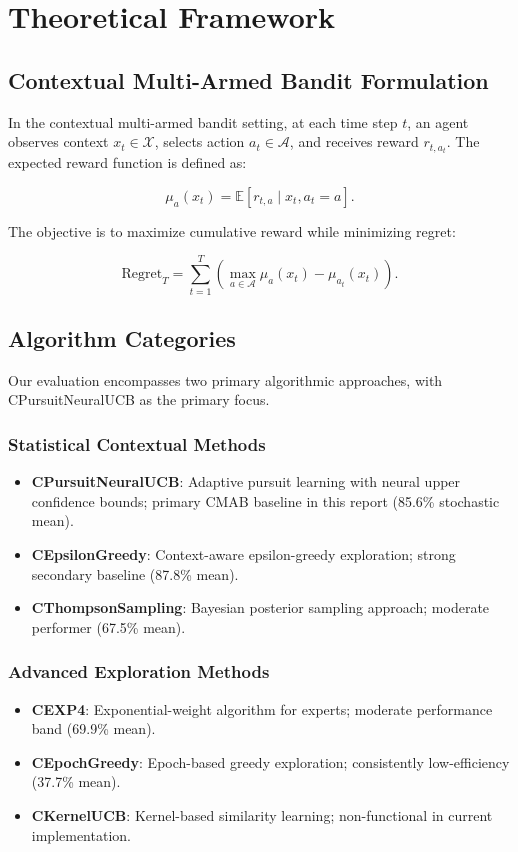 \documentclass[12pt,a4paper]{article}
\begin{document}
\section{Theoretical Framework}

\subsection{Contextual Multi-Armed Bandit Formulation}

In the contextual multi-armed bandit setting, at each time step $t$, an agent observes context $x_t \in \mathcal{X}$, selects action $a_t \in \mathcal{A}$, and receives reward $r_{t,a_t}$. The expected reward function is defined as:

\begin{equation}
\mu_a(x_t) = \mathbb{E}[r_{t,a} \mid x_t, a_t = a].
\end{equation}

The objective is to maximize cumulative reward while minimizing regret:

\begin{equation}
\text{Regret}_T = \sum_{t=1}^{T} \left(\max_{a \in \mathcal{A}} \mu_a(x_t) - \mu_{a_t}(x_t)\right).
\end{equation}

\subsection{Algorithm Categories}

Our evaluation encompasses two primary algorithmic approaches, with CPursuitNeuralUCB as the primary focus.

\subsubsection{Statistical Contextual Methods}
\begin{itemize}
    \item \textbf{CPursuitNeuralUCB}: Adaptive pursuit learning with neural upper confidence bounds; primary CMAB baseline in this report (85.6\% stochastic mean).
    \item \textbf{CEpsilonGreedy}: Context-aware epsilon-greedy exploration; strong secondary baseline (87.8\% mean).
    \item \textbf{CThompsonSampling}: Bayesian posterior sampling approach; moderate performer (67.5\% mean).
\end{itemize}

\subsubsection{Advanced Exploration Methods}
\begin{itemize}
    \item \textbf{CEXP4}: Exponential-weight algorithm for experts; moderate performance band (69.9\% mean).
    \item \textbf{CEpochGreedy}: Epoch-based greedy exploration; consistently low-efficiency (37.7\% mean).
    \item \textbf{CKernelUCB}: Kernel-based similarity learning; non-functional in current implementation.
\end{itemize}
\end{document}
